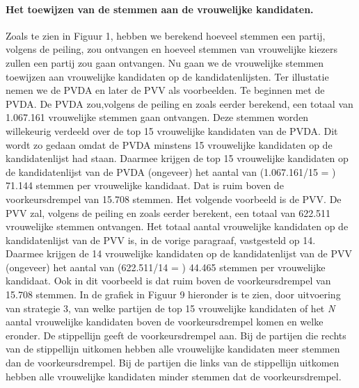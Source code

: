 \paragraph{Het toewijzen van de stemmen aan de vrouwelijke kandidaten.}
Zoals te zien in Figuur 1, hebben we berekend hoeveel stemmen een partij, volgens de peiling, zou ontvangen en hoeveel stemmen van vrouwelijke kiezers zullen een partij zou gaan ontvangen. Nu gaan we de vrouwelijke stemmen toewijzen aan vrouwelijke kandidaten op de kandidatenlijsten. Ter illustatie nemen we de PVDA en later de PVV als voorbeelden. Te beginnen met de PVDA. De PVDA zou,volgens de peiling en zoals eerder berekend, een totaal van 1.067.161 vrouwelijke stemmen gaan ontvangen. Deze stemmen worden willekeurig verdeeld over de top 15 vrouwelijke kandidaten van de PVDA. Dit wordt zo gedaan omdat de PVDA minstens 15 vrouwelijke kandidaten op de kandidatenlijst had staan. Daarmee krijgen de top 15 vrouwelijke kandidaten op de kandidatenlijst van de PVDA (ongeveer) het aantal van (1.067.161/15 = ) 71.144 stemmen per vrouwelijke kandidaat. Dat is ruim boven de voorkeursdrempel van 15.708 stemmen. Het volgende voorbeeld is de PVV. De PVV zal, volgens de peiling en zoals eerder berekent, een totaal van 622.511 vrouwelijke stemmen ontvangen. Het totaal aantal vrouwelijke kandidaten op de kandidatenlijst van de PVV is, in de vorige paragraaf, vastgesteld op 14. Daarmee krijgen de 14 vrouwelijke kandidaten op de kandidatenlijst van de PVV (ongeveer) het aantal van (622.511/14 = ) 44.465 stemmen per vrouwelijke kandidaat. Ook in dit voorbeeld is dat ruim boven de voorkeursdrempel van 15.708 stemmen. In de grafiek in Figuur 9 hieronder is te zien, door uitvoering van strategie 3, van welke partijen de top 15 vrouwelijke kandidaten of het \textit{N} aantal vrouwelijke kandidaten boven de voorkeursdrempel komen en welke eronder. De stippellijn geeft de voorkeursdrempel aan. Bij de partijen die rechts van de stippellijn uitkomen hebben alle vrouwelijke kandidaten meer stemmen dan de voorkeursdrempel. Bij de partijen die links van de stippellijn uitkomen hebben alle vrouwelijke kandidaten minder stemmen dat de voorkeursdrempel. 

